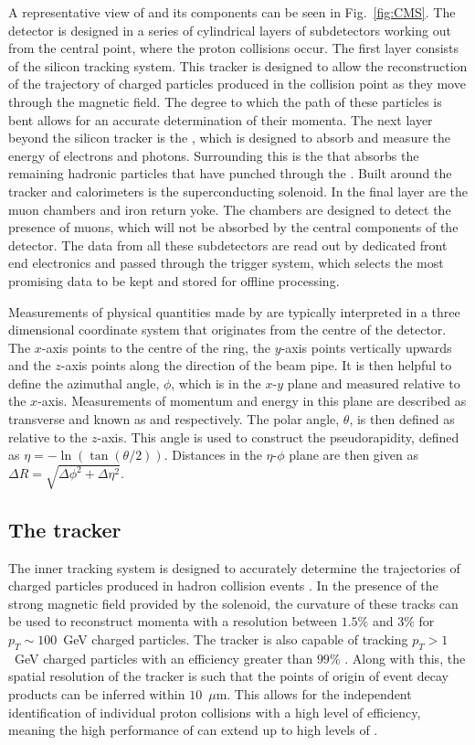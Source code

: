 A representative view of \CMS and its components can be seen in
Fig.~\ref{fig:CMS}. The detector is designed in a series of
cylindrical layers of subdetectors working out from the central point,
where the proton collisions occur. The first layer consists of the
silicon tracking system. This tracker is designed to allow the
reconstruction of the trajectory of charged particles produced in the
collision point as they move through the magnetic field. The degree to
which the path of these particles is bent allows for an accurate
determination of their momenta. The next layer beyond the silicon
tracker is the \ECAL, which is designed to absorb and measure the
energy of electrons and photons. Surrounding this is the \HCAL that
absorbs the remaining hadronic particles that have punched through the
\ECAL. Built around the tracker and calorimeters is the superconducting
solenoid. In the final layer are the muon chambers and iron return
yoke. The chambers are designed to detect the presence of muons, which
will not be absorbed by the central components of the detector. The
data from all these subdetectors are read out by dedicated front end
electronics and passed through the \CMS trigger system, which
selects the most promising data to be kept and stored for offline
processing. 

Measurements of physical quantities made by \CMS are typically
interpreted in a three dimensional coordinate system that originates
from the centre of the detector. The $x$-axis points to the
centre of the \LHC ring, the $y$-axis points vertically upwards and
the $z$-axis points along the direction of the \LHC beam pipe. It is
then helpful to define the azimuthal angle, $\phi$, which is in the
$x$-$y$ plane and measured relative to the $x$-axis. Measurements of
momentum and energy in this plane are described as transverse and
known as \pt and \Et respectively. The polar angle, $\theta$, is then
defined as relative to the $z$-axis. This angle is used to construct
the pseudorapidity, defined as $\eta=-\ln(\tan(\theta/2))$. Distances in
the $\eta$-$\phi$ plane are then given as $\Delta R =
\sqrt{\Delta\phi^2+\Delta\eta^2}$.

\subsection{The tracker} 
\label{sec:tracker}

The \CMS inner tracking system is designed to accurately determine the
trajectories of charged particles produced in hadron collision events
\cite{Karimaki:368412}. In the presence of the strong magnetic field
provided by the \CMS solenoid, the curvature of these tracks can be
used to reconstruct momenta with a resolution between $1.5\%$ and
$3\%$ for $p_T\sim 100$~GeV charged particles. The tracker is also
capable of tracking \mbox{$p_T>1$~GeV} charged particles with an
efficiency greater than $99\%$ \cite{Bayatian:2006zz}. Along with
this, the spatial resolution of the tracker is such that the points of
origin of event decay products can be inferred within $10$~$\mu$m.
This allows for the independent identification of individual proton
collisions with a high level of efficiency, meaning the high
performance of \CMS can extend up to high levels
of \PU.%

